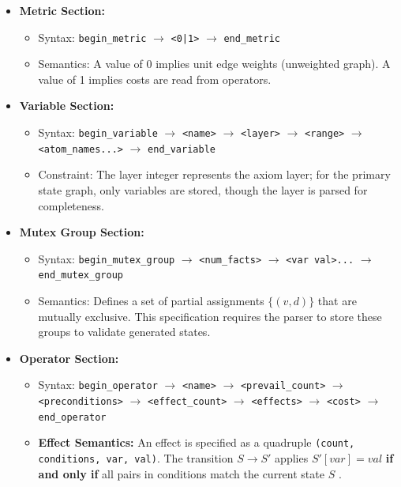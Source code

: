 \documentclass[12pt,a4paper]{report}
\begin{document}
\begin{itemize}
    \item \textbf{Metric Section:}
    \begin{itemize}
        \item Syntax: \texttt{begin\_metric} $\to$ \texttt{<0|1>} $\to$ \texttt{end\_metric}
        \item Semantics: A value of 0 implies unit edge weights (unweighted graph). A value of 1 implies costs are read from operators.
    \end{itemize}
    
    \item \textbf{Variable Section:}
    \begin{itemize}
        \item Syntax: \texttt{begin\_variable} $\to$ \texttt{<name>} $\to$ \texttt{<layer>} $\to$ \texttt{<range>} $\to$ \texttt{<atom\_names...>} $\to$ \texttt{end\_variable}
        \item Constraint: The layer integer represents the axiom layer; for the primary state graph, only variables are stored, though the layer is parsed for completeness.
    \end{itemize}
    
    \item \textbf{Mutex Group Section:}
    \begin{itemize}
        \item Syntax: \texttt{begin\_mutex\_group} $\to$ \texttt{<num\_facts>} $\to$ \texttt{<var val>...} $\to$ \texttt{end\_mutex\_group}
        \item Semantics: Defines a set of partial assignments $\{(v, d)\}$ that are mutually exclusive. This specification requires the parser to store these groups to validate generated states.
    \end{itemize}
    
    \item \textbf{Operator Section:}
    \begin{itemize}
        \item Syntax: \texttt{begin\_operator} $\to$ \texttt{<name>} $\to$ \texttt{<prevail\_count>} $\to$ \texttt{<preconditions>} $\to$ \texttt{<effect\_count>} $\to$ \texttt{<effects>} $\to$ \texttt{<cost>} $\to$ \texttt{end\_operator}
        \item \textbf{Effect Semantics:} An effect is specified as a quadruple \texttt{(count, conditions, var, val)}. The transition $S \to S'$ applies $S'[var] = val$ \textbf{if and only if} all pairs in conditions match the current state $S$ \cite{saslexer}.
    \end{itemize}
\end{itemize}
\end{document}
